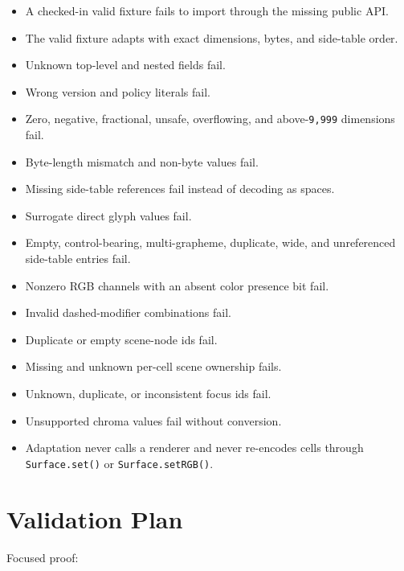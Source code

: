\begin{itemize}
\tightlist
\item
  A checked-in valid fixture fails to import through the missing public API.
\item
  The valid fixture adapts with exact dimensions, bytes, and side-table order.
\item
  Unknown top-level and nested fields fail.
\item
  Wrong version and policy literals fail.
\item
  Zero, negative, fractional, unsafe, overflowing, and above-\texttt{9\allowbreak{},\allowbreak{}9\allowbreak{}9\allowbreak{}9} dimensions fail.
\item
  Byte-length mismatch and non-byte values fail.
\item
  Missing side-table references fail instead of decoding as spaces.
\item
  Surrogate direct glyph values fail.
\item
  Empty, control-bearing, multi-grapheme, duplicate, wide, and unreferenced side-table entries fail.
\item
  Nonzero RGB channels with an absent color presence bit fail.
\item
  Invalid dashed-modifier combinations fail.
\item
  Duplicate or empty scene-node ids fail.
\item
  Missing and unknown per-cell scene ownership fails.
\item
  Unknown, duplicate, or inconsistent focus ids fail.
\item
  Unsupported chroma values fail without conversion.
\item
  Adaptation never calls a renderer and never re-encodes cells through \texttt{S\allowbreak{}u\allowbreak{}r\allowbreak{}f\allowbreak{}a\allowbreak{}c\allowbreak{}e\allowbreak{}.\allowbreak{}s\allowbreak{}e\allowbreak{}t\allowbreak{}(\allowbreak{})} or \texttt{S\allowbreak{}u\allowbreak{}r\allowbreak{}f\allowbreak{}a\allowbreak{}c\allowbreak{}e\allowbreak{}.\allowbreak{}s\allowbreak{}e\allowbreak{}t\allowbreak{}R\allowbreak{}G\allowbreak{}B\allowbreak{}(\allowbreak{})}.
\end{itemize}

\section{Validation Plan}\label{record-164-validation-plan}

Focused proof:

